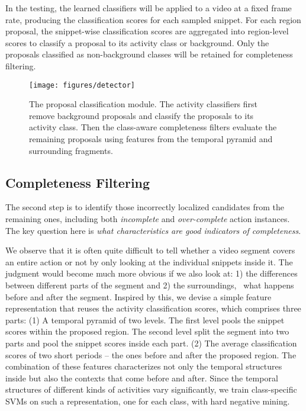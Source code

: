 \documentclass[10pt,twocolumn,letterpaper]{article}
\begin{document}
In the testing, the learned classifiers will be applied to a video at a fixed frame rate, producing the classification scores for each sampled snippet. 
For each region proposal, the snippet-wise classification scores are aggregated into
region-level scores to classify a proposal to its activity class or background.
Only the proposals classified as non-background classes will be retained for completeness filtering.


\begin{figure}
\centering
\texttt{[image: figures/detector]}
\caption{The proposal classification module. The activity classifiers first remove background proposals and classify the proposals to its activity class.
	Then the class-aware completeness filters evaluate the remaining proposals using features from the temporal pyramid and surrounding fragments.}
\label{fig:detector}
\end{figure}


\subsection{Completeness Filtering}
\label{sec:detector/loc}

The second step is to identify those incorrectly localized candidates from the remaining ones,
including both \emph{incomplete} and \emph{over-complete} action instances. 
The key question here is {\em what characteristics are good indicators of completeness}.

We observe that it is often quite difficult to tell whether a video segment covers an entire action or not
by only looking at the individual snippets inside it. 
The judgment would become much more obvious if we also look at: 1) the differences between different parts of the segment and 2) the surroundings, \eg~what happens
before and after the segment.
Inspired by this, we devise a simple feature representation that reuses the activity classification scores, 
which comprises three parts:
(1) A temporal pyramid of two levels. The first level pools the snippet scores within the proposed region. The second level split the segment into two parts and pool the snippet scores inside each part.
(2) The average classification scores of two short periods -- the ones before and after the proposed region.
The combination of these features characterizes not only the temporal structures inside but also 
the contexts that come before and after. 
Since the temporal structures of different kinds of activities vary significantly,
we train class-specific SVMs on such a representation, one for each class, with hard negative mining. 
\end{document}
